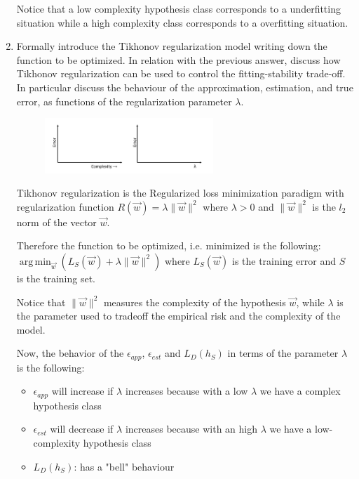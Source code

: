 \documentclass[a4paper,11pt,oneside]{book}
\DeclareMathOperator*{\argmin}{arg\,min}
\begin{document}
\begin{enumerate}
\begin{solution}
    Notice that a low complexity hypothesis class corresponds to a underfitting situation while a high complexity class corresponds to a overfitting situation.
    \end{solution}
\item Formally introduce the Tikhonov regularization model writing down the function to be optimized. In relation with the previous answer, discuss how Tikhonov regularization can be used to control the fitting-stability trade-off. In particular discuss the behaviour of the approximation, estimation, and true error, as functions of the regularization parameter $\lambda$.
    \begin{figure}[H]
        \centering
        \includegraphics[width=0.6\textwidth,height=0.6\textheight,keepaspectratio]{images/3_29_June_2020.png}
    \end{figure}

    \begin{solution}
        Tikhonov regularization is the Regularized loss minimization paradigm with regularization function $R(\vec{w}) = \lambda\|\vec{w}\|^2$ where $\lambda > 0$ and $\|\vec{w}\|^2$ is the $l_2$ norm of the vector $\vec{w}$.
        
        Therefore the function to be optimized, i.e. minimized is the following: $\argmin_{\vec{w}}(L_S(\vec{w}) + \lambda\|\vec{w}\|^2)$ where $L_S(\vec{w})$ is the training error and $S$ is the training set.
        
        Notice that $\|\vec{w}\|^2$ measures the complexity of the hypothesis $\vec{w}$, while $\lambda$ is the parameter used to tradeoff the empirical risk and the complexity of the model.
        
        Now, the behavior of the $\epsilon_{app}$, $\epsilon_{est}$ and $L_D(h_S)$ in terms of the parameter $\lambda$ is the following:
        \begin{itemize}
        \item $\epsilon_{app}$ will increase if $\lambda$ increases because with a low $\lambda$ we have a complex hypothesis class
        \item $\epsilon_{est}$ will decrease if $\lambda$ increases because with an high $\lambda$ we have a low-complexity hypothesis class
        \item $L_D(h_S)$: has a "bell" behaviour
        \end{itemize}
        

\end{solution}
\end{enumerate}
\end{document}
